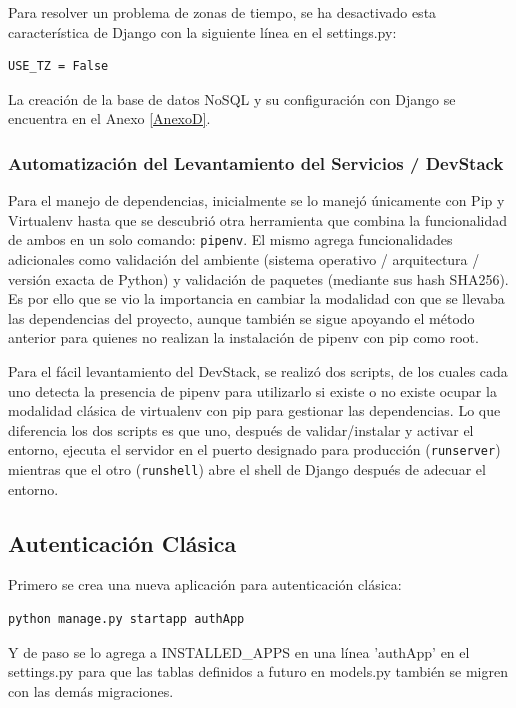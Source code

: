 Para resolver un problema de zonas de tiempo, se ha desactivado esta característica de Django con la siguiente línea en el settings.py:
\lstset{language=Python}
\begin{lstlisting}
USE_TZ = False
\end{lstlisting}
\lstset{language=Bash}

La creación de la base de datos NoSQL y su configuración con Django se encuentra en el Anexo \ref{AnexoD}.

\subsubsection{Automatización del Levantamiento del Servicios / DevStack}
Para el manejo de dependencias, inicialmente se lo manejó únicamente con Pip y Virtualenv hasta que se descubrió otra herramienta que combina la funcionalidad de ambos en un solo comando: \texttt{pipenv}. El mismo agrega funcionalidades adicionales como validación del ambiente (sistema operativo / arquitectura / versión exacta de Python) y validación de paquetes (mediante sus hash SHA256). Es por ello que se vio la importancia en cambiar la modalidad con que se llevaba las dependencias del proyecto, aunque también se sigue apoyando el método anterior para quienes no realizan la instalación de pipenv con pip como root.

Para el fácil levantamiento del DevStack, se realizó dos scripts, de los cuales cada uno detecta la presencia de pipenv para utilizarlo si existe o no existe ocupar la modalidad clásica de virtualenv con pip para gestionar las dependencias. Lo que diferencia los dos scripts es que uno, después de validar/instalar y activar el entorno, ejecuta el servidor en el puerto designado para producción (\texttt{runserver}) mientras que el otro (\texttt{runshell}) abre el shell de Django después de adecuar el entorno.

\subsection{Autenticación Clásica}

Primero se crea una nueva aplicación para autenticación clásica:
\begin{lstlisting}
python manage.py startapp authApp
\end{lstlisting}

Y de paso se lo agrega a INSTALLED\_APPS en una línea 'authApp' en el settings.py para que las tablas definidos a futuro en models.py también se migren con las demás migraciones.

